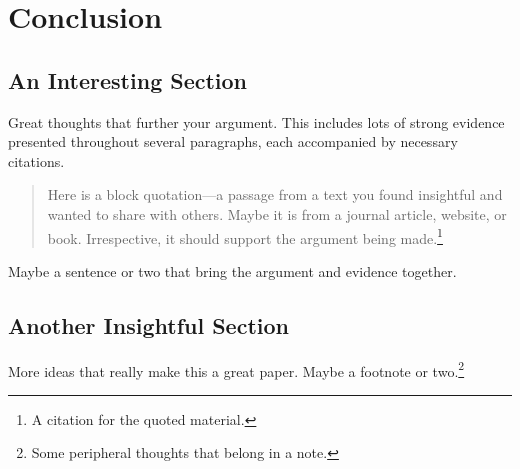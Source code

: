 \chapter{Conclusion}
\label{chapter:conclusion}


\section{An Interesting Section}

Great thoughts that further your argument. This includes lots of strong evidence presented throughout several paragraphs, each accompanied by necessary citations.
\begin{quotation}
    \noindent Here is a block quotation---a passage from a text you found insightful and wanted to share with others. Maybe it is from a journal article, website, or book. Irrespective, it should support the argument being made.\footnote{A citation for the quoted material.}
\end{quotation}
Maybe a sentence or two that bring the argument and evidence together.\citep{dos_santos_2020}



\section{Another Insightful Section}

More ideas that really make this a great paper. Maybe a footnote or two.\footnote{Some peripheral thoughts that belong in a note.}

